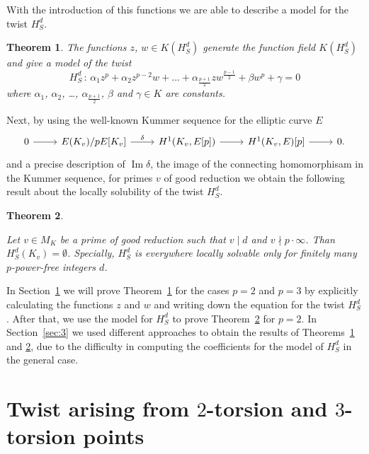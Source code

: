 \documentclass[a4paper, 12pt]{amsart}
\newtheorem{theorem}{Theorem}[section]
\theoremstyle{definition}
\theoremstyle{remark}
\DeclareMathOperator{\im}{Im}
\numberwithin{equation}{section}
\begin{document}
With the introduction of this functions we are able to describe a model for the twist $H_S^d$.


\begin{theorem}\label{p-twist_model}
    The functions $z$, $w \in K(H_S^d)$ generate the function field $K(H_S^d)$ and give a model of the twist 
    \[
        H_S^d\,:\, \alpha_{1}z^p+\alpha_2z^{p-2}w+\dotso+\alpha_{\frac{p+1}{2}}zw^{\frac{p-1}{2}}+\beta w^p+\gamma=0
    \]
    where $\alpha_1$, $\alpha_2$, \ldots, $\alpha_{\frac{p+1}{2}}$, $\beta$ and $\gamma \in K$ are constants.
\end{theorem}

Next, by using the well-known Kummer sequence for the elliptic curve $E$
\begin{equation}\label{eq:kummer_seq}
    \begin{tikzcd}
        0 \arrow[r] & E(K_v)/pE[K_v] \arrow[r, "\delta"] & H^1(K_v,E[p]) \arrow[r] & H^1(K_v,E)[p] \arrow[r] & 0.
    \end{tikzcd}    
\end{equation}
and a precise description of $\im{\delta}$, the image of the connecting homomorphisam in the Kummer sequence, for primes $v$ of good reduction we obtain the following result about the locally solubility of the twist $H_S^d$.

\begin{theorem}\label{thm_Hd_ELS_1}
    
    Let $v \in M_K$ be a prime of good reduction such that $v\mid d$ and $v \nmid p \cdot \infty$. 
    Than $H_S^d(K_v) = \emptyset$.
    Specially, $H_S^d$ is everywhere locally solvable only for finitely many $p$-power-free integers $d$.
\end{theorem}

In Section~\ref{sec:2} we will prove Theorem~\ref{p-twist_model} for the cases $p=2$ and $p=3$ by explicitly calculating the functions $z$ and $w$ and writing down the equation for the twist $H_S^d$. After that, we use the model for $H_S^d$ to prove Theorem~\ref{thm_Hd_ELS_1} for $p=2$.
In Section~\ref{sec:3} we used different approaches to obtain the results of Theorems~\ref{p-twist_model} and \ref{thm_Hd_ELS_1}, due to the difficulty in computing the coefficients for the model of $H_S^d$ in the general case.


\section{Twist arising from \texorpdfstring{$2$}{2}-torsion and \texorpdfstring{$3$}{3}-torsion points}\label{sec:2}
\end{document}
